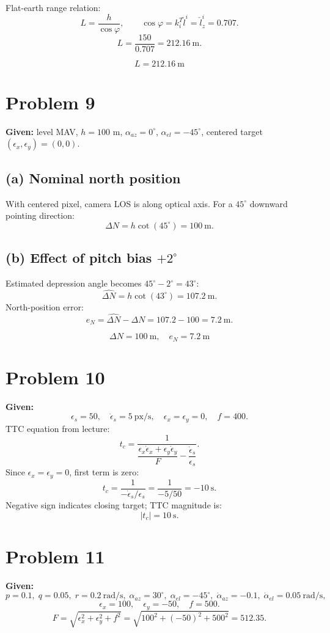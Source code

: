 \documentclass[11pt,a4paper]{article}
\begin{document}
Flat-earth range relation:
\[
L=\frac{h}{\cos\varphi},\qquad
\cos\varphi=k_i^T\check l^i=\check l_z^i=0.707.
\]
\[
L=\frac{150}{0.707}=212.16~\text{m}.
\]

\[
\boxed{L=212.16~\text{m}}
\]

\section{Problem 9}
\textbf{Given:}
level MAV, $h=100$ m, $\alpha_{az}=0^\circ$, $\alpha_{el}=-45^\circ$, centered target $(\epsilon_x,\epsilon_y)=(0,0)$.

\subsection*{(a) Nominal north position}
With centered pixel, camera LOS is along optical axis. For a $45^\circ$ downward pointing direction:
\[
\Delta N = h\cot(45^\circ)=100~\text{m}.
\]

\subsection*{(b) Effect of pitch bias $+2^\circ$}
Estimated depression angle becomes $45^\circ-2^\circ=43^\circ$:
\[
\widehat{\Delta N}=h\cot(43^\circ)=107.2~\text{m}.
\]
North-position error:
\[
e_N=\widehat{\Delta N}-\Delta N=107.2-100=7.2~\text{m}.
\]

\[
\boxed{\Delta N=100~\text{m},\quad e_N=7.2~\text{m}}
\]

\section{Problem 10}
\textbf{Given:}
\[
\epsilon_s=50,\quad \dot\epsilon_s=5~\text{px/s},\quad
\epsilon_x=\epsilon_y=0,\quad f=400.
\]
TTC equation from lecture:
\[
t_c=\frac{1}{\dfrac{\epsilon_x\dot\epsilon_x+\epsilon_y\dot\epsilon_y}{F}-\dfrac{\dot\epsilon_s}{\epsilon_s}}.
\]
Since $\epsilon_x=\epsilon_y=0$, first term is zero:
\[
t_c=\frac{1}{-\dot\epsilon_s/\epsilon_s}
=\frac{1}{-5/50}=-10~\text{s}.
\]
Negative sign indicates closing target; TTC magnitude is:
\[
\boxed{|t_c|=10~\text{s}}.
\]

\section{Problem 11}
\textbf{Given:}
\[
p=0.1,\;q=0.05,\;r=0.2~\text{rad/s},\;
\alpha_{az}=30^\circ,\;\alpha_{el}=-45^\circ,\;
\dot\alpha_{az}=-0.1,\;\dot\alpha_{el}=0.05~\text{rad/s},
\]
\[
\epsilon_x=100,\quad \epsilon_y=-50,\quad f=500.
\]
\[
F=\sqrt{\epsilon_x^2+\epsilon_y^2+f^2}
=\sqrt{100^2+(-50)^2+500^2}=512.35.
\]
\end{document}
